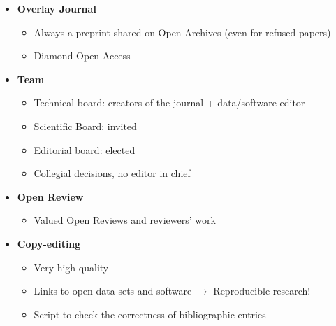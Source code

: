 \documentclass[10pt,compress,serif,aspectratio=169]{beamer}
\begin{document}
\begin{frame}[t]
 \vskip0.6cm
 \begin{itemize}
  \item \textbf{Overlay Journal}
  \begin{itemize}
  \item Always a preprint shared on Open Archives (even for refused papers)
  \item Diamond Open Access
  \end{itemize}
  \item \textbf{Team}
  \begin{itemize}
  \item Technical board: creators of the journal + data/software editor
  \item Scientific Board: invited
  \item Editorial board: elected
  \item Collegial decisions, no editor in chief
  \end{itemize}
	\item\textbf{Open Review}
	\begin{itemize}
    \item Valued Open Reviews and reviewers' work
	\end{itemize}
  \item \textbf{Copy-editing}
  \begin{itemize}
  \item Very high quality
  \item Links to open data sets and software $\to$ Reproducible research!
  \item Script to check the correctness of bibliographic entries
  \end{itemize}
 \end{itemize}

\end{frame}



\end{document}
